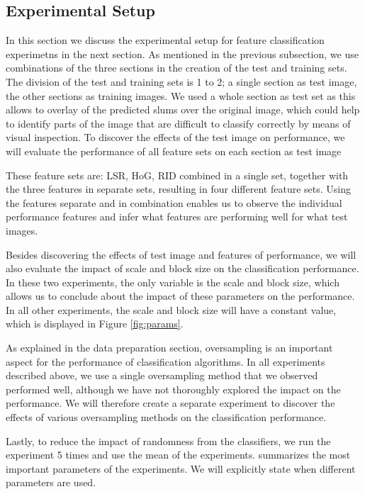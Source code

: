\subsection{Experimental Setup}

In this section we discuss the experimental setup for feature classification experimetns in the next section. As mentioned in the previous subsection, we use combinations of the three sections in the creation of the test and training sets. The division of the test and training sets is 1 to 2; a single section as test image, the other sections as training images. We used a whole section as test set as this allows to overlay of the predicted slums over the original image, which could help to identify parts of the image that are difficult to classify correctly by means of visual inspection. To discover the effects of the test image on performance, we will evaluate the performance of all feature sets on each section as test image

These feature sets are: LSR, HoG, RID combined in a single set, together with the three features in separate sets, resulting in four different feature sets. Using the features separate and in combination enables us to observe the individual performance features and infer what features are performing well for what test images.

Besides discovering the effects of test image and features of performance, we will also evaluate the impact of scale and block size on the classification performance. In these two experiments, the only variable is the scale and block size, which allows us to conclude about the impact of these parameters on the performance. In all other experiments, the scale and block size will have a constant value, which is displayed in Figure \ref{fig:params}.


As explained in the data preparation section, oversampling is an important aspect for the performance of classification algorithms. In all experiments described above, we use a single oversampling method that we observed performed well, although we have not thoroughly explored the impact on the performance. We will therefore create a separate experiment to discover the effects of various oversampling methods on the classification performance. 
%

Lastly, to reduce the impact of randomness from the classifiers, we run the experiment 5 times and use the mean of the experiments. summarizes the most important parameters of the experiments. We will explicitly state when different parameters are used.

